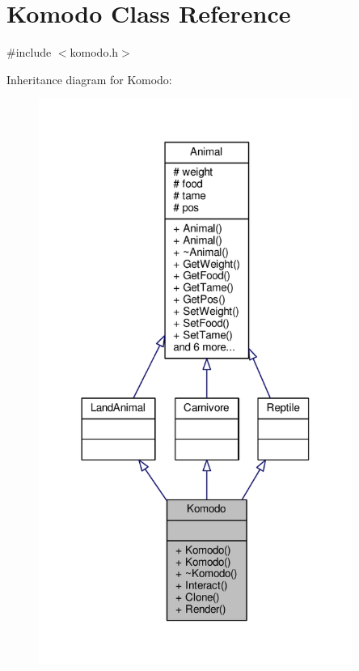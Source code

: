 \hypertarget{classKomodo}{}\section{Komodo Class Reference}
\label{classKomodo}


{\ttfamily \#include $<$komodo.\+h$>$}



Inheritance diagram for Komodo\+:
\nopagebreak
\begin{figure}[H]
\begin{center}
\leavevmode
\includegraphics[width=291pt]{classKomodo__inherit__graph}
\end{center}
\end{figure}


